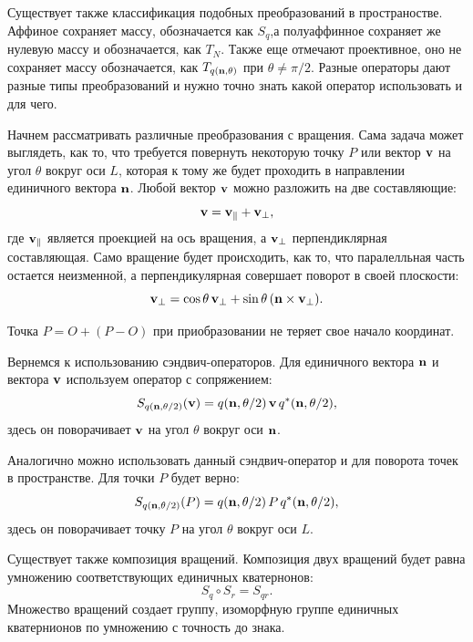 Существует также классификация подобных преобразований в пространостве. Аффиное сохраняет массу, обозначается как $S_q$,а полуаффинное сохраняет же нулевую массу и обозначается, как $T_N$. Также еще отмечают проективное, оно не сохраняет массу обозначается, как $T_{q(\vb{n},\theta)}$ при $\theta \neq \pi/2$. Разные операторы дают разные типы преобразований и нужно точно знать какой оператор использовать и для чего.

Начнем рассматривать различные преобразования с вращения. Сама задача может выглядеть, как то, что требуется повернуть некоторую точку $P$ или вектор $\vb{v}$ на угол $\theta$ вокруг оси $L$, которая к тому же будет проходить в направлении единичного вектора $\vb{n}$.
Любой вектор $\vb{v}$ можно разложить на две составляющие:
\begin{equation*}
    \vb{v} = \vb{v}_{\parallel} + \vb{v}_{\perp},
\end{equation*}
где $\vb{v}_{\parallel}$ является проекцией на ось вращения, а $\vb{v}_{\perp}$ перпендиклярная составляющая.
Само вращение будет происходить, как то, что паралелльная часть остается неизменной, а перпендикулярная совершает поворот в своей плоскости:
\begin{equation*}
    \vb{v}_{\perp} = \cos\theta\,\vb{v}_{\perp} + \sin\theta\,(\vb{n}\times\vb{v}_{\perp}).
\end{equation*}

Точка $P = O + (P - O)$ при приобразовании не теряет свое начало координат.

Вернемся к использованию сэндвич-операторов. Для единичного вектора $\vb{n}$ и вектора $\vb{v}$ используем оператор с сопряжением:
\begin{equation*}
    S_{q(\vb{n}, \theta/2)}(\vb{v}) = q(\vb{n}, \theta/2)\,\vb{v}\,q^*(\vb{n}, \theta/2),
\end{equation*}
здесь он поворачивает $\vb{v}$ на угол $\theta$ вокруг оси $\vb{n}$.

Аналогично можно использовать данный сэндвич-оператор и для поворота точек в пространстве. Для точки $P$  будет верно:
\begin{equation*}
    S_{q(\vb{n}, \theta/2)}(P) = q(\vb{n}, \theta/2)\,P\,q^*(\vb{n}, \theta/2),
\end{equation*}
здесь он поворачивает точку $P$ на угол $\theta$ вокруг оси $L$.

Существует также композиция вращений. Композиция двух вращений будет равна умножению соответствующих единичных кватернонов:
\begin{equation*}
    S_q \circ S_r = S_{qr}.
\end{equation*}
Множество вращений создает группу, изоморфную группе единичных кватернионов по умножению с точность до знака.

